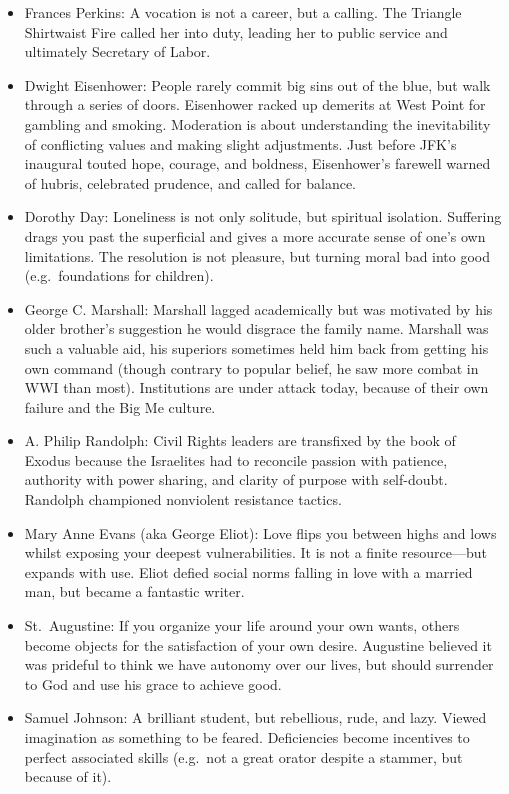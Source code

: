 \documentclass[
]{article}
\begin{document}
\begin{itemize}
\item
  Frances Perkins: A vocation is not a career, but a calling. The
  Triangle Shirtwaist Fire called her into duty, leading her to public
  service and ultimately Secretary of Labor.
\item
  Dwight Eisenhower: People rarely commit big sins out of the blue, but
  walk through a series of doors. Eisenhower racked up demerits at West
  Point for gambling and smoking. Moderation is about understanding the
  inevitability of conflicting values and making slight adjustments.
  Just before JFK's inaugural touted hope, courage, and boldness,
  Eisenhower's farewell warned of hubris, celebrated prudence, and
  called for balance.
\item
  Dorothy Day: Loneliness is not only solitude, but spiritual isolation.
  Suffering drags you past the superficial and gives a more accurate
  sense of one's own limitations. The resolution is not pleasure, but
  turning moral bad into good (e.g.~foundations for children).
\item
  George C. Marshall: Marshall lagged academically but was motivated by
  his older brother's suggestion he would disgrace the family name.
  Marshall was such a valuable aid, his superiors sometimes held him
  back from getting his own command (though contrary to popular belief,
  he saw more combat in WWI than most). Institutions are under attack
  today, because of their own failure and the Big Me culture.
\item
  A. Philip Randolph: Civil Rights leaders are transfixed by the book of
  Exodus because the Israelites had to reconcile passion with patience,
  authority with power sharing, and clarity of purpose with self-doubt.
  Randolph championed nonviolent resistance tactics.
\item
  Mary Anne Evans (aka George Eliot): Love flips you between highs and
  lows whilst exposing your deepest vulnerabilities. It is not a finite
  resource---but expands with use. Eliot defied social norms falling in
  love with a married man, but became a fantastic writer.
\item
  St.~Augustine: If you organize your life around your own wants, others
  become objects for the satisfaction of your own desire. Augustine
  believed it was prideful to think we have autonomy over our lives, but
  should surrender to God and use his grace to achieve good.
\item
  Samuel Johnson: A brilliant student, but rebellious, rude, and lazy.
  Viewed imagination as something to be feared. Deficiencies become
  incentives to perfect associated skills (e.g.~not a great orator
  despite a stammer, but because of it).
\end{itemize}
\end{document}
